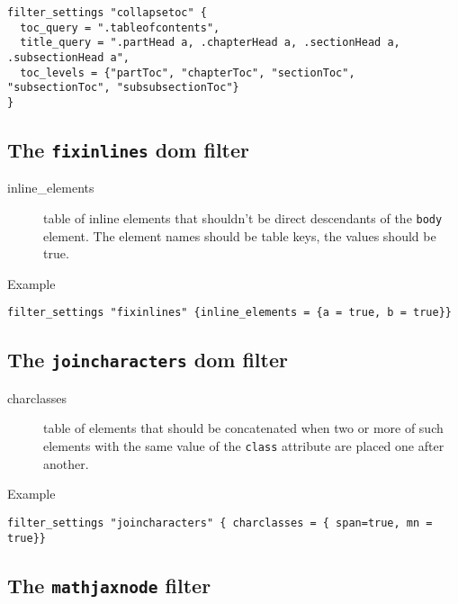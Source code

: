 \begin{verbatim}
filter_settings "collapsetoc" {
  toc_query = ".tableofcontents",
  title_query = ".partHead a, .chapterHead a, .sectionHead a, .subsectionHead a",
  toc_levels = {"partToc", "chapterToc", "sectionToc", "subsectionToc", "subsubsectionToc"}
}
\end{verbatim}

\hypertarget{the-fixinlines-dom-filter}{%
\subsection{\texorpdfstring{The \texttt{fixinlines} dom
filter}{The fixinlines dom filter}}\label{the-fixinlines-dom-filter}}

\begin{description}
\item[inline\_elements]
table of inline elements that shouldn't be direct descendants of the
\texttt{body} element. The element names should be table keys, the
values should be true.
\end{description}

Example

\begin{verbatim}
filter_settings "fixinlines" {inline_elements = {a = true, b = true}}
\end{verbatim}

\hypertarget{the-joincharacters-dom-filter}{%
\subsection{\texorpdfstring{The \texttt{joincharacters} dom
filter}{The joincharacters dom filter}}\label{the-joincharacters-dom-filter}}

\begin{description}
\item[charclasses]
table of elements that should be concatenated when two or more of such
elements with the same value of the \texttt{class} attribute are placed
one after another.
\end{description}

Example

\begin{verbatim}
filter_settings "joincharacters" { charclasses = { span=true, mn = true}}
\end{verbatim}

\hypertarget{mathjaxsettings}{%
\subsection{\texorpdfstring{The \texttt{mathjaxnode}
filter}{The mathjaxnode filter}}\label{mathjaxsettings}}

